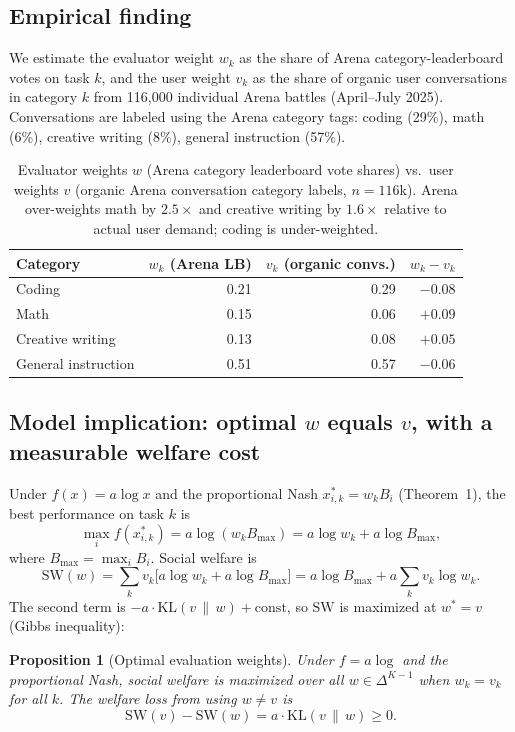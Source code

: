 \documentclass{article}
\newtheorem{proposition}{Proposition}
\theoremstyle{definition}
\begin{document}
\subsection*{Empirical finding}

We estimate the evaluator weight $w_k$ as the share of Arena category-leaderboard
votes on task $k$, and the user weight $v_k$ as the share of organic user
conversations in category $k$ from 116{,}000 individual Arena battles
(April--July 2025).  Conversations are labeled using the Arena category tags:
coding (29\%), math (6\%), creative writing (8\%), general instruction (57\%).

\begin{table}[h]
\centering
\begin{tabular}{lrrr}
\toprule
Category & $w_k$ (Arena LB) & $v_k$ (organic convs.) & $w_k - v_k$ \\
\midrule
Coding              & 0.21 & 0.29 & $-0.08$ \\
Math                & 0.15 & 0.06 & $+0.09$ \\
Creative writing    & 0.13 & 0.08 & $+0.05$ \\
General instruction & 0.51 & 0.57 & $-0.06$ \\
\bottomrule
\end{tabular}
\caption{Evaluator weights $w$ (Arena category leaderboard vote shares) vs.\
user weights $v$ (organic Arena conversation category labels, $n=116$k).
Arena over-weights math by $2.5\times$ and creative writing by $1.6\times$
relative to actual user demand; coding is under-weighted.}
\label{tab:w_v}
\end{table}

\subsection*{Model implication: optimal $w$ equals $v$, with a measurable welfare cost}

Under $f(x) = a\log x$ and the proportional Nash $x_{i,k}^* = w_k B_i$
(Theorem~1), the best performance on task $k$ is
\[
  \max_i f(x_{i,k}^*) = a\log(w_k B_{\max}) = a\log w_k + a\log B_{\max},
\]
where $B_{\max} = \max_i B_i$.  Social welfare is
\[
  \mathrm{SW}(w) = \sum_k v_k \bigl[a\log w_k + a\log B_{\max}\bigr]
  = a\log B_{\max} + a\sum_k v_k \log w_k.
\]
The second term is $-a \cdot \mathrm{KL}(v \,\|\, w) + \text{const}$, so
$\mathrm{SW}$ is maximized at $w^* = v$ (Gibbs inequality):

\begin{proposition}[Optimal evaluation weights]\label{prop:opt-w}
Under $f = a\log$ and the proportional Nash, social welfare is maximized over
all $w \in \Delta^{K-1}$ when $w_k = v_k$ for all $k$.  The welfare loss from
using $w \neq v$ is
\[
  \mathrm{SW}(v) - \mathrm{SW}(w) = a \cdot \mathrm{KL}(v \,\|\, w) \geq 0.
\]
\end{proposition}
\end{document}

